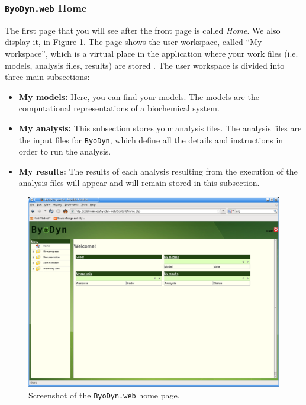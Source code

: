\documentclass[a4paper, 11pt]{article}
\begin{document}
  \subsubsection{\texttt{ByoDyn.web} Home}
  The first page that you will see after the front page is called \emph{Home}.
  We also display it, in Figure \ref{home}. 
  The page shows the user workspace, called ``My workspace'', which is a virtual place in the application where your work files (i.e. models, analysis files, results) are stored . 
  The user workspace is divided into three main subsections:
  \begin{itemize}
  \item \textbf{My models:} 
    Here, you can find your models. 
    The models are the computational representations of a biochemical system. 
  \item \textbf{My analysis:} 
    This subsection stores your analysis files. 
    The analysis files are the input files for \texttt{ByoDyn}, which define all the details and instructions in order to run the analysis.
  \item \textbf{My results:} 
    The results of each analysis resulting from the execution of the analysis files will appear and will remain stored in this subsection.
\end{itemize}
  \begin{figure}[ht!]
    \begin{center}
      \includegraphics[scale=0.35]{figures/screenShots/home.eps}
      \caption{
        Screenshot of the \texttt{ByoDyn.web} home page.
      }
      \label{home}
    \end{center}
  \end{figure}
\end{document}
